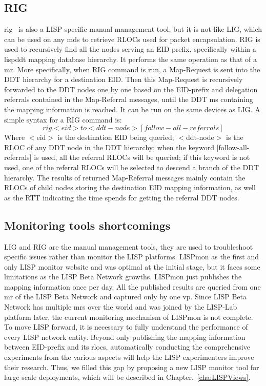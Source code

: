 \subsection{RIG}
\label{subsec:monitor_rig}
\acrfull{rig}~\cite{rfc8112} is also a LISP-specific manual management tool, but it is not like LIG, which can be used on any \acrshort{mds} to retrieve RLOCs used for packet encapsulation. RIG is used to recursively find all the nodes serving an EID-prefix, specifically within a \acrshort{lispddt} mapping database hierarchy. It performs the same operation as that of a \acrshort{mr}. More specifically, when RIG command is run, a Map-Request is sent into the DDT hierarchy for a destination EID. Then this Map-Request is recursively forwarded to the DDT nodes one by one based on the EID-prefix and delegation referrals contained in the Map-Referral messages, until the DDT \acrshort{ms} containing the mapping information is reached. It can be run on the same devices as LIG. A simple syntax for a RIG command is:
\begin{equation}
rig <eid> to <ddt-node> [follow-all-referrals] \nonumber
\end{equation}
Where $<$eid$>$ is the destination EID being queried; $<$ddt-node$>$ is the RLOC of any DDT node in the DDT hierarchy; when the keyword $[$follow-all-referrals$]$ is used, all the referral RLOCs will be queried; if this keyword is not used, one of the referral RLOCs will be selected to descend a branch of the DDT hierarchy. The results of returned Map-Referral messages mainly contain the RLOCs of child nodes storing the destination EID mapping information, as well as the RTT indicating the time spends for getting the referral DDT nodes.

\subsection{Monitoring tools shortcomings}
\label{subsec:monitor_missing}
LIG and RIG are the manual management tools, they are used to troubleshoot specific issues rather than monitor the LISP platforms. LISPmon as the first and only LISP monitor website and was optimal at the initial stage, but it faces some limitations as the LISP Beta Network growths. LISPmon just publishes the mapping information once per day. All the published results are queried from one \acrshort{mr} of the LISP Beta Network and captured only by one \acrfull{vp}. Since LISP Beta Network has multiple \acrshort{mr}s over the world and was joined by the LISP-Lab platform later, the current monitoring mechanism of LISPmon is not complete. To move LISP forward, it is necessary to fully understand the performance of every LISP network entity. Beyond only publishing the mapping information between EID-prefix and its \acrshort{rloc}s, automatically conducting the comprehensive experiments from the various aspects will help the LISP experimenters improve their research. Thus, we filled this gap by proposing a new LISP monitor tool for large scale deployments, which will be described in Chapter.~\ref{cha:LISPViews}.


